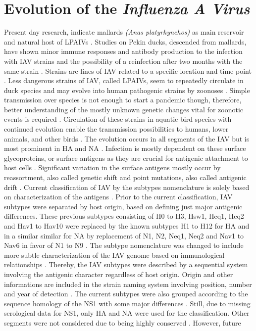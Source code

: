 \section{Evolution of the \textit{Influenza A Virus}}

Present day research, indicate mallards \textit{(Anas platyrhynchos)} as main reservoir and natural host of \glspl{LPAIV} \autocite{jourdain_influenza_2010}. Studies on Pekin ducks, descended from mallards, have shown minor immune responses and antibody production to the infection with \gls{IAV} strains and the possibility of a reinfection after two months with the same strain \autocite{kida_duck_1980}. Strains are lines of \gls{IAV} related to a specific location and time point \autocite{cann_chapter_2016}. Less dangerous strains of \gls{IAV}, called \glspl{LPAIV}, seem to repeatedly circulate in duck species and may evolve into human pathogenic strains by zoonoses \autocite{jourdain_influenza_2010}. Simple transmission over species is not enough to start a pandemic though, therefore, better understanding of the mostly unknown genetic changes vital for zoonotic events is required \autocite{van_reeth_avian_2007}. Circulation of these strains in aquatic bird species with continued evolution enable the transmission possibilities to humans, lower animals, and other birds \autocite{webster_chapter_1999}. The evolution occurs in all segments of the \gls{IAV} but is most prominent in \gls{HA} and \gls{NA} \autocite{webster_chapter_1999}. Infection is mostly dependent on these surface glycoproteins, or surface antigens as they are crucial for antigenic attachment to host cells \autocite{cann_chapter_2016}. Significant variation in the surface antigens mostly occur by reassortment, also called genetic shift and point mutations, also called antigenic drift \autocite{webster_chapter_1999}. Current classification of \gls{IAV} by the subtypes nomenclature is solely based on characterization of the antigens \autocite{noauthor_revision_1980}. Prior to the current classification, \gls{IAV} subtypes were separated by host origin, based on defining just major antigenic differences. These previous subtypes consisting of H0 to H3, Hsw1, Heq1, Heq2 and Hav1 to Hav10 were replaced by the known subtypes H1 to H12 for \gls{HA} and in a similar similar for \gls{NA} by replacement of N1, N2, Neq1, Neq2 and Nav1 to Nav6 in favor of N1 to N9 \autocite{noauthor_revised_1971}. The subtype nomenclature was changed to include more subtle characterization of the \gls{IAV} genome based on immunological relationships \autocite{noauthor_reconsideration_1979}. Thereby, the \gls{IAV} subtypes were described by a sequential system involving the antigenic character regardless of host origin. Origin and other informations are included in the strain naming system involving position, number and year of detection \autocite{noauthor_revision_1980}. The current subtypes were also grouped according to the sequence homology of the \gls{NS1} with some major differences \autocite{noauthor_reconsideration_1979}. Still, due to missing serological data for \gls{NS1}, only \gls{HA} and \gls{NA} were used for the classification. Other segments were not considered due to being highly conserved \autocite{noauthor_reconsideration_1979}. However, future 